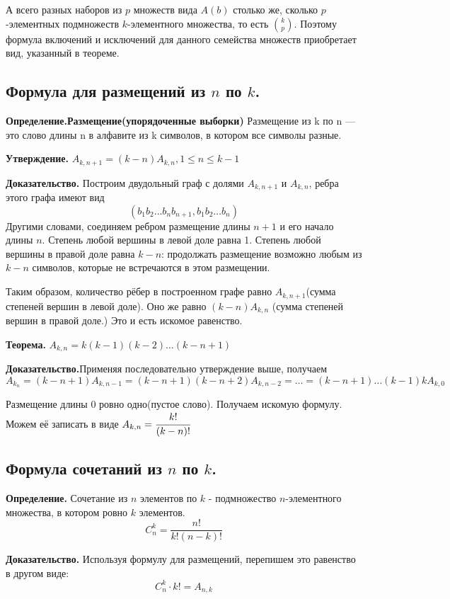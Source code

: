 \documentclass[a4paper, 10pt]{article}
\begin{document}
А всего разных наборов из $p$ множеств вида $A(b)$ столько же, сколько $p$-элементных подмножеств $k$-элементного множества, то есть $\binom{k}{p}$. Поэтому формула включений и исключений для данного семейства множеств приобретает вид, указанный в теореме.


\subsection{Формула для размещений из $n$ по $k$.}

\textbf{Определение.Размещение(упорядоченные выборки)} Размещение из k по n — это слово длины n в алфавите из k символов, в котором все символы разные.

\textbf{Утверждение.} $A_{k, n + 1} = (k - n)A_{k, n}, 1 \leqslant n \leqslant k - 1$

\textbf{Доказательство.} Построим двудольный граф с долями $A_{k, n+1}$ и $A_{k, n}$, ребра этого графа имеют вид $$(b_1b_2 \dots b_nb_{n+1}, b_1b_2 \dots b_n)$$ Другими словами, соединяем ребром размещение длины $n + 1$ и его начало длины $n$. Степень любой вершины в левой доле равна 1. Степень любой вершины в правой доле равна $k - n$: продолжать размещение возможно любым из $k - n$ символов, которые не встречаются в этом размещении.

Таким образом, количество рёбер в построенном графе равно $A_{k, n+1}$(сумма степеней вершин в левой доле). Оно же равно $(k - n)A_{k, n}$ (сумма степеней вершин в правой доле.) Это и есть искомое равенство.

\textbf{Теорема.} $A_{k, n} = k(k-1)(k-2) \dots (k - n + 1)$

\textbf{Доказательство.}Применяя последовательно утверждение выше, получаем $$A_{k_n} = (k - n + 1)A_{k, n - 1} = (k - n + 1)(k - n + 2)A_{k, n -2} = \dots = (k - n + 1) \dots (k - 1)kA_{k, 0}$$

Размещение длины 0 ровно одно(пустое слово). Получаем искомую формулу. Можем её записать в виде $A_{k, n} = \cfrac{k!}{(k - n)!}$

\subsection{Формула сочетаний из $n$ по $k$.}

\textbf{Определение.} Сочетание из $n$ элементов по $k$ - подмножество $n$-элементного множества, в котором ровно $k$ элементов. $$C^k_n = \frac{n!}{k!(n - k)!}$$

\textbf{Доказательство.} Используя формулу для размещений, перепишем это равенство в другом виде: $$C_n^k \cdot k! = A_{n, k}$$
\end{document}
